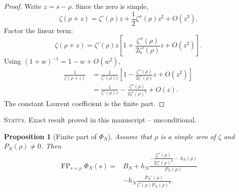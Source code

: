 \documentclass[11pt]{amsart}
\numberwithin{equation}{section}
\theoremstyle{plain}
\newtheorem{proposition}[theorem]{Proposition}
\theoremstyle{definition}
\theoremstyle{remark}
\DeclareMathOperator{\FP}{FP}
\newcommand{\1}{\mathbf{1}}
\newcommand{\statusnote}[1]{%
  \par\smallskip\noindent
  \begingroup\footnotesize\textsc{Status.} #1\endgroup
  \par\smallskip}
\begin{document}
\begin{proof}
Write \(z=s-\rho\).  Since the zero is simple,
\begin{equation}
\zeta(\rho+z)
=
\zeta'(\rho)z
+
\frac12\zeta''(\rho)z^2
+
O(z^3).
\label{eq:inverse_zeta_taylor_detailed}
\end{equation}
Factor the linear term:
\begin{equation}
\zeta(\rho+z)
=
\zeta'(\rho)z
\left[
1+
\frac{\zeta''(\rho)}{2\zeta'(\rho)}z
+O(z^2)
\right].
\label{eq:inverse_zeta_factor_detailed}
\end{equation}
Using \((1+w)^{-1}=1-w+O(w^2)\),
\begin{align}
\frac1{\zeta(\rho+z)}
&=
\frac1{\zeta'(\rho)z}
\left[
1-
\frac{\zeta''(\rho)}{2\zeta'(\rho)}z
+O(z^2)
\right]
\label{eq:inverse_zeta_invert_detailed}
\\
&=
\frac1{\zeta'(\rho)z}
-
\frac{\zeta''(\rho)}{2\zeta'(\rho)^2}
+O(z).
\label{eq:inverse_zeta_laurent_detailed}
\end{align}
The constant Laurent coefficient is the finite part.
\end{proof}

\statusnote{Exact result proved in this manuscript -- unconditional.}
\begin{proposition}[Finite part of \(\Phi_N\)]
\label{prop:finite_part_Phi}
Assume that \(\rho\) is a simple zero of \(\zeta\) and
\(P_N(\rho)\neq0\).  Then
\begin{align}
\FP_{s=\rho}\Phi_N(s)
={}&
B_N
+
h_N
\frac{
-\dfrac{\zeta''(\rho)}{2\zeta'(\rho)^2}
-A_N(\rho)
}{
P_N(\rho)
}
\label{eq:Phi_finite_part_first}
\\
&-
h_N
\frac{P_N'(\rho)}
{\zeta'(\rho)P_N(\rho)^2}.
\label{eq:Phi_finite_part_second}
\end{align}
\end{proposition}
\end{document}

